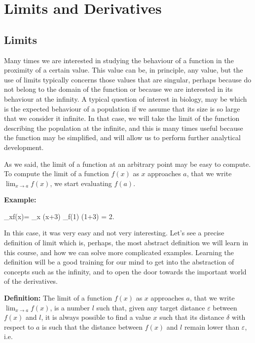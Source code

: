

\section{Limits and Derivatives}\label{diff}


\subsection{Limits}

Many times we are interested in studying the behaviour of a function in the proximity
of a certain value. This value can be, in principle, any value, 
but the use of limits typically concerns those values that are singular, perhaps because do not belong to the domain of the function or because we are interested
in its behaviour at the infinity. A typical question of interest in biology, may be
which is the expected behaviour of a population if we assume that its size is so large
that we consider it infinite. In that case, we will take the limit of the function
describing the population at the infinite, and this is many times useful because
the function may be simplified, and will allow us to perform further analytical development.

As we said, the limit of a function at an arbitrary point may be easy to compute. To compute
the limit of a function $f(x)$ as $x$ approaches $a$, that we write $\lim_{x\rightarrow a}f(x)$,
we start evaluating $f(a)$.

{\bf Example:} 

\bnn
 \lim_{x}f(x)= \lim_{x} (x+3) \underbrace{=}_{f(1)} (1+3) = 2.
\enn

In this case, it was very easy and not very interesting. Let's see a precise 
definition of limit which is, perhaps, the most abstract definition we will learn in this course, and how we can solve more complicated examples. Learning the definition will be a good training for our mind to get into the abstraction of concepts such as the infinity, and to open
the door towards the important world of the derivatives. 

{\bf Definition:} The limit of a function $f(x)$ as $x$ approaches $a$, that we write $\lim_{x\rightarrow a}f(x)$,
is a number $l$ such that, given any target distance $\varepsilon$ between $f(x)$ and $l$, it is always possible to find a value $x$ such that its distance $\delta$ with respect to $a$ is such that the distance between $f(x)$ and $l$ remain lower than $\varepsilon$, i.e.

